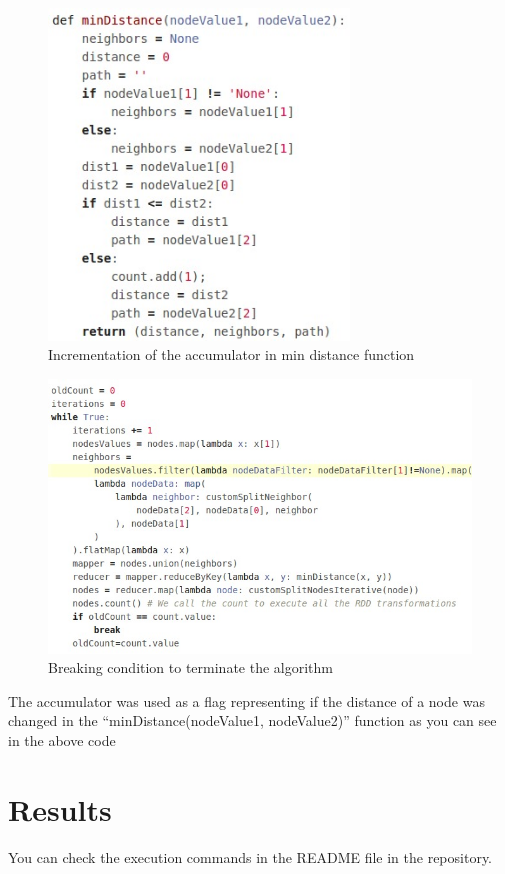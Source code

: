 \documentclass[english]{article}
\begin{document}
\begin{figure}[h]
\centering
\includegraphics[width=8cm]{img/min-distance.jpeg}
\caption{Incrementation of the accumulator in min distance function}
\end{figure}

\begin{figure}[h]
\centering
\includegraphics[width=12cm]{img/loop.jpeg}
\caption{Breaking condition to terminate the algorithm}
\end{figure}

The accumulator was used as a flag representing if the distance of a node was changed in the “minDistance(nodeValue1, nodeValue2)” function as you can see in the above code

\newpage
\section{Results}

You can check the execution commands in the README file in the repository.\\
\end{document}
